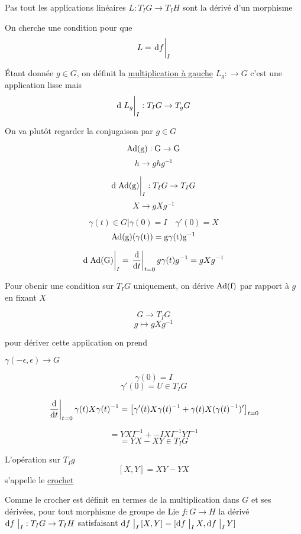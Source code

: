 
\begin{tcolorbox}[title=Attention, colframe=red]
	Pas tout les applications linéaires \(L: T_I G \to T_I H \) sont la dérivé d'un morphisme 
\end{tcolorbox}

On cherche une condition pour que \[ L = \eval{\dd f}_{I}   \]


Étant donnée \(g \in G\), on définit la \underline{multiplication à gauche} \(L_g : \to  G\) c'est une application lisse 
mais 
\[ \dd \eval{L_g }_{I} : T_I G \to T_g G  \]

On va plutôt regarder la conjugaison par \(g \in G\)

\[ \rm{Ad}(g) : G \to G \]
\[ h \to g h g ^{-1} \]

\[ \dd \eval{\rm{Ad}(g)}_{I} : T_I G \to T_I G   \]
\[ X \to gX g ^{-1} \]

\[ \gamma(t) \in G | \gamma(0) = I \quad \gamma' (0) = X \]
\[ \rm{Ad}(g) (\gamma(t)) = g \gamma(t) g ^{-1} \]

\[ \dd \eval{\rm{Ad}(G)}_{I} = \eval{\dv{{}}{t}}_{t=0} g \gamma (t) g ^{-1} = g X g ^{-1}  \]

Pour obenir une condition sur \(T_I G\) uniquement, on dérive \(\rm{Ad}(f)\) par rapport à \(g\) en fixant \(X\)

\[ G \to T_I G \]
\[ g\mapsto g X g ^{-1} \]

pour dériver cette appilcation on prend 

\(\gamma (-\epsilon, \epsilon) \to G \)

\[ \gamma(0) = I \]
\[ \gamma'(0) = U  \in T_I G \]

\[ \eval{\dv{{}}{t} }_{t=0} \gamma(t) X \gamma(t) ^{-1}  = \left[ \gamma'(t) X \gamma(t) ^{-1} + \gamma(t) X (\gamma(t)^{-1}  )'\right]_{t=0}  \]



\[ = YXI^{-1} + -IXI^{-1}Y I^{-1} \]
\[ = YX - XY \in T_I G \]


L'opération sur \(T_I g\)
\[ [X, Y] = XY - YX  \] s'appelle le \underline{crochet} 



Comme le crocher est définit en termes de la multiplication dans \(G\) et ses dérivées, pour tout morphisme de groupe de Lie \( f: G \to H\) la dérivé \( \dd f \eval{}_{I}: T_I G \to T_I H \) satisfaisant \( \dd f \eval{}_{I} [X, Y] = [ \dd f \eval{}_{I} X, \dd f \eval{}_{I} Y   ] \)



